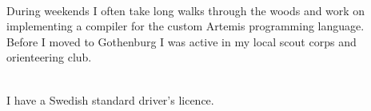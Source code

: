 \documentclass[9pt]{developercv}
\begin{document}
\hfill
\begin{minipage}[t]{0.4\textwidth}
	\vspace{-\baselineskip}
	\\During weekends I often take long walks through the woods and work
	on implementing a compiler for the custom Artemis programming language.
	\\Before I moved to Gothenburg I was active in my local scout corps and
	orienteering club.
\end{minipage}
\hfill
\begin{minipage}[t]{0.3\textwidth}
	\vspace{-\baselineskip}
	\\I have a Swedish standard driver's licence.
\end{minipage}
\end{document}
